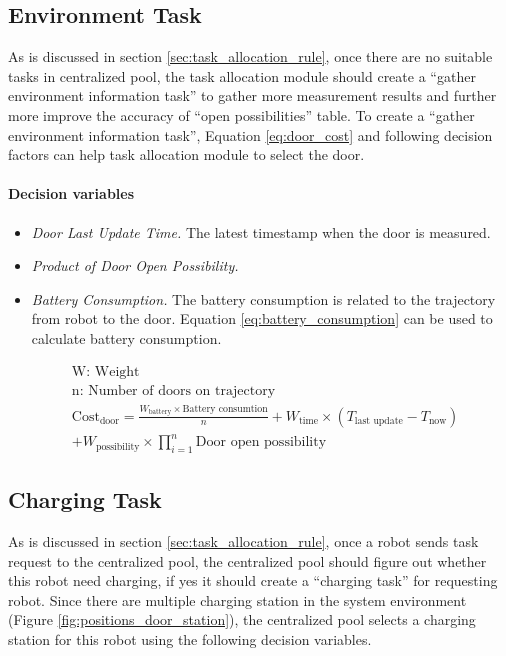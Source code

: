 \subsection{Environment Task}
As is discussed in section \ref{sec:task_allocation_rule}, once there are no suitable tasks in centralized pool, the task allocation module should create a ``gather environment information task'' to gather more measurement results and further more improve the accuracy of ``open possibilities'' table.
To create a ``gather environment information task'', Equation \ref{eq:door_cost} and following decision factors can help task allocation module to select the door.

\paragraph*{Decision variables}
\begin{itemize}
	\item \textsl{Door Last Update Time.} The latest timestamp when the door is measured.
	\item \textsl{Product of Door Open Possibility.}
	\item \textsl{Battery Consumption.} The battery consumption is related to the trajectory from robot to the door. Equation \ref{eq:battery_consumption} can be used to calculate battery consumption.
\end{itemize}

\begin{equation}
	\label{eq:door_cost}
	\begin{aligned}
	& \mbox{W: Weight } \\
	& \mbox{n: Number of doors on trajectory} \\	
	& \mbox{Cost}_{\mbox{door}} = \frac{W_{\mbox{battery}} \times \mbox{Battery consumtion}}{n} + W_{\mbox{time}} \times (T_{\mbox{last update}} - T_{\mbox{now}}) \\
	& + W_{\mbox{possibility}} \times \prod\limits_{i=1}^n \mbox{Door open possibility}
	\end{aligned}
\end{equation}

\subsection{Charging Task}
As is discussed in section \ref{sec:task_allocation_rule}, once a robot sends task request to the centralized pool, the centralized pool should figure out whether this robot need charging, if yes it should create a ``charging task'' for requesting robot. Since there are multiple charging station in the system environment (Figure \ref{fig:positions_door_station}), the centralized pool selects a charging station for this robot using the following decision variables.

